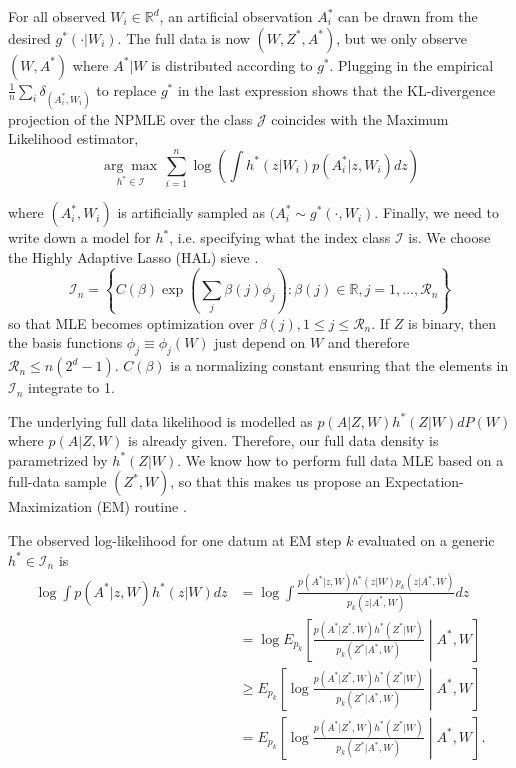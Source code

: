\documentclass[12pt]{article}
\theoremstyle{thmstyleone}%
\theoremstyle{thmstyletwo}%
\theoremstyle{thmstylethree}%
\begin{document}
For all observed $W_i \in \mathbb{R}^d$, an artificial observation $A^*_i$ can be drawn from the desired $g^*(\cdot|W_i)$. The full data is now $(W,Z^*,A^*)$, but we only observe $(W,A^*)$ where $A^*|W$ is distributed according to $g^* $. Plugging in the empirical $\frac{1}{n} \sum_i\delta_{(A^*_i,W_i)}$ to replace $g^*$ in the last expression shows that the KL-divergence projection of the NPMLE over the class $\mathcal{J}$ coincides with the Maximum Likelihood estimator, 
$$  \underset{h^* \in \mathcal{I}}{\arg \max} \, \sum_{i=1}^n\log \left(\int h^*(z|W_i) p(A^*_i|z,W_i) dz\right) $$

where $(A^*_i,W_i)$ is artificially sampled as $(A^*_i\sim g^*(\cdot,W_i)$. Finally, we need to write down a model for $h^*$, i.e. specifying what the index class $\mathcal{I}$ is. We choose the Highly Adaptive Lasso (HAL) sieve \citep{hal}.  \begin{equation}\label{sieve}
	\mathcal{I}_n = \left\{C(\beta)\exp{\left(\sum_{j} \beta(j) \phi_j\right) : \beta(j) \in \mathbb{R}, j = 1,\ldots,\mathcal{R}_n }\right\}\end{equation}
	so that MLE becomes optimization over $\beta(j), 1 \leq j \leq \mathcal{R}_n $. 
 If $Z$ is binary, then the basis functions $\phi_j \equiv \phi_j(W)$ just depend on $W$ and therefore $\mathcal{R}_n \leq n(2^d-1)$. $C(\beta)$ is a normalizing constant ensuring that the elements in $\mathcal{I}_n$ integrate to 1. 



The underlying full data likelihood is modelled as $p(A|Z,W)h^*(Z|W)dP(W)$ where $p(A|Z,W)$ is already given. Therefore, our full data density is parametrized by $h^*(Z|W)$. We know how to perform full data MLE based on a full-data sample $(Z^*,W)$, so that this makes us propose an Expectation-Maximization (EM) routine \citep{dempster}.


The observed log-likelihood for one datum at EM step $k$ evaluated on a generic $h^*\in \mathcal{I}_n$ is
$$\begin{aligned}
	\log \int p(A^*|z,W) h^*(z|W)dz   &=  \log \int \frac{ p(A^*|z,W) h^*(z|W)p_k(z|A^*,W)}{p_k(z|A^*,W)}dz   \\  &= \log E_{p_k} \left[\frac{ p(A^*|Z^*,W) h^*(Z^*|W)}{p_k(Z^*|A^*,W)} \middle| A^*,W\right] \\ &\geq  E_{p_k} \left[\log \frac{ p(A^*|Z^*,W) h^*(Z^*|W)}{p_k(Z^*|A^*,W)} \middle| A^*,W\right] \\ &=   E_{p_k} \left[\log \frac{ p(A^*|Z^*,W) h^*(Z^*|W)}{p_k(Z^*|A^*,W)} \middle| A^*,W\right]. \\
\end{aligned}$$
\end{document}
